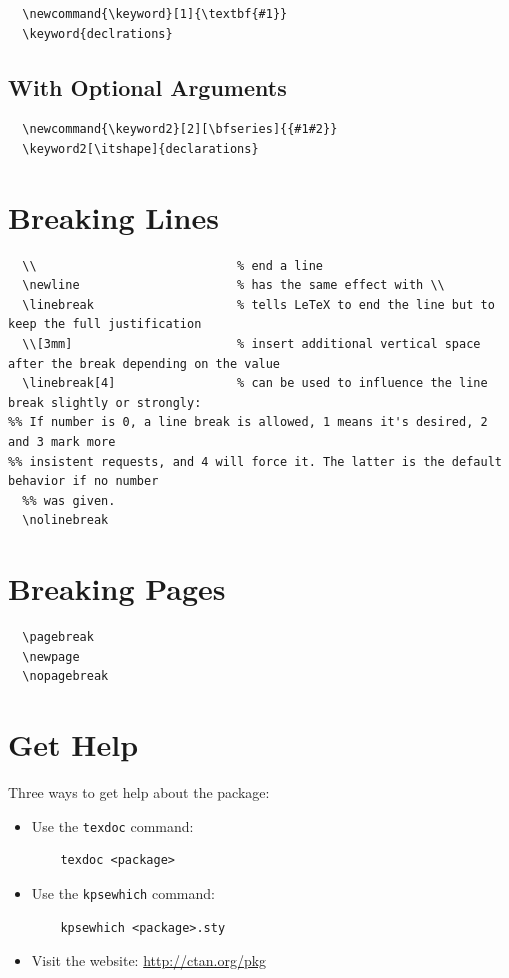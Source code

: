\begin{lstlisting}
  \newcommand{\keyword}[1]{\textbf{#1}}
  \keyword{declrations}
\end{lstlisting}

\subsection{With Optional Arguments}

\begin{lstlisting}
  \newcommand{\keyword2}[2][\bfseries]{{#1#2}}
  \keyword2[\itshape]{declarations}
\end{lstlisting}


\section{Breaking Lines}
\begin{lstlisting}
  \\                            % end a line
  \newline                      % has the same effect with \\
  \linebreak                    % tells LeTeX to end the line but to keep the full justification
  \\[3mm]                       % insert additional vertical space after the break depending on the value
  \linebreak[4]                 % can be used to influence the line break slightly or strongly:
%% If number is 0, a line break is allowed, 1 means it's desired, 2 and 3 mark more
%% insistent requests, and 4 will force it. The latter is the default behavior if no number
  %% was given.
  \nolinebreak
\end{lstlisting}


\section{Breaking Pages}
\begin{lstlisting}
  \pagebreak
  \newpage
  \nopagebreak
\end{lstlisting}


\section{Get Help}
Three ways to get help about the package:
\begin{itemize}
\item Use the \verb|texdoc| command:
  \begin{lstlisting}
    texdoc <package>
  \end{lstlisting}
\item Use the \verb|kpsewhich| command:
  \begin{lstlisting}
    kpsewhich <package>.sty
  \end{lstlisting}
\item Visit the website: \url{http://ctan.org/pkg}
\end{itemize}
